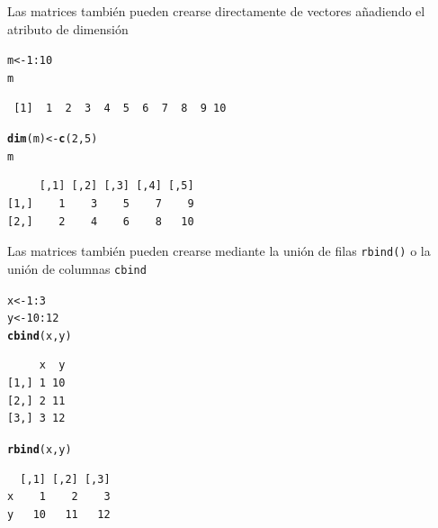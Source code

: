\documentclass{article}\usepackage[]{graphicx}\usepackage[]{color}
\makeatletter
\newcommand{\hlnum}[1]{\textcolor[rgb]{0.686,0.059,0.569}{#1}}%
\newcommand{\hlopt}[1]{\textcolor[rgb]{0,0,0}{#1}}%
\newcommand{\hlstd}[1]{\textcolor[rgb]{0.345,0.345,0.345}{#1}}%
\newcommand{\hlkwb}[1]{\textcolor[rgb]{0.69,0.353,0.396}{#1}}%
\newcommand{\hlkwd}[1]{\textcolor[rgb]{0.737,0.353,0.396}{\textbf{#1}}}%
\newenvironment{kframe}{%
 \def\at@end@of@kframe{}%
 \ifinner\ifhmode%
  \def\at@end@of@kframe{\end{minipage}}%
  \begin{minipage}{\columnwidth}%
 \fi\fi%
 \def\FrameCommand##1{\hskip\@totalleftmargin \hskip-\fboxsep
 \colorbox{shadecolor}{##1}\hskip-\fboxsep
     \hskip-\linewidth \hskip-\@totalleftmargin \hskip\columnwidth}%
 \MakeFramed {\advance\hsize-\width
   \@totalleftmargin\z@ \linewidth\hsize
   \@setminipage}}%
 {\par\unskip\endMakeFramed%
 \at@end@of@kframe}
\newenvironment{knitrout}{}{} %
\makeatother
\begin{document}
    Las matrices también pueden crearse directamente de vectores añadiendo el atributo de dimensión
\begin{knitrout}
\color{fgcolor}\begin{kframe}
\begin{alltt}
  \hlstd{m} \hlkwb{<-} \hlnum{1}\hlopt{:}\hlnum{10}
  \hlstd{m}
\end{alltt}
\begin{verbatim}
 [1]  1  2  3  4  5  6  7  8  9 10
\end{verbatim}
\begin{alltt}
  \hlkwd{dim}\hlstd{(m)} \hlkwb{<-} \hlkwd{c}\hlstd{(}\hlnum{2}\hlstd{,} \hlnum{5}\hlstd{)}
  \hlstd{m}
\end{alltt}
\begin{verbatim}
     [,1] [,2] [,3] [,4] [,5]
[1,]    1    3    5    7    9
[2,]    2    4    6    8   10
\end{verbatim}
\end{kframe}
\end{knitrout}

    Las matrices también pueden crearse mediante la unión de filas \texttt{rbind()} o la unión de columnas \texttt{cbind}
\begin{knitrout}
\color{fgcolor}\begin{kframe}
\begin{alltt}
  \hlstd{x} \hlkwb{<-} \hlnum{1}\hlopt{:}\hlnum{3}
  \hlstd{y} \hlkwb{<-} \hlnum{10}\hlopt{:}\hlnum{12}
  \hlkwd{cbind}\hlstd{(x ,y)}
\end{alltt}
\begin{verbatim}
     x  y
[1,] 1 10
[2,] 2 11
[3,] 3 12
\end{verbatim}
\begin{alltt}
  \hlkwd{rbind}\hlstd{(x, y)}
\end{alltt}
\begin{verbatim}
  [,1] [,2] [,3]
x    1    2    3
y   10   11   12
\end{verbatim}
\end{kframe}
\end{knitrout}
\end{document}
